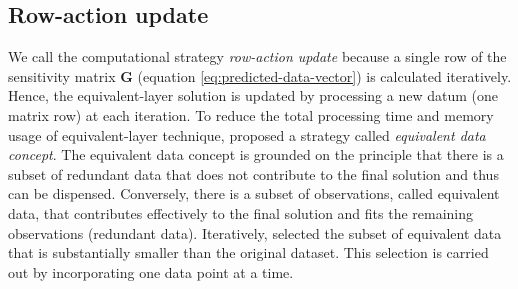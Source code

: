 \subsection{Row-action update}

We call the computational strategy \textit{row-action update} because a single row of the sensitivity matrix  
$\mathbf{G}$ (equation \ref{eq:predicted-data-vector}) is calculated iteratively.
Hence, the equivalent-layer solution is updated by processing a new datum (one matrix row) at each iteration.
To reduce the total processing time and memory usage of equivalent-layer technique, \cite{mendonca-silva1994} proposed 
a strategy called \textit{equivalent data concept}.
The equivalent data concept is grounded on the  principle  that there is a subset of redundant data that does not 
contribute to the final solution and thus can be dispensed.
Conversely, there is a subset of observations, called equivalent data, that  contributes effectively to the 
final solution and fits the remaining observations (redundant data).
Iteratively, \cite{mendonca-silva1994} selected the subset of equivalent data that is substantially smaller than 
the original dataset. 
This selection is carried out by incorporating one data point at a time.

